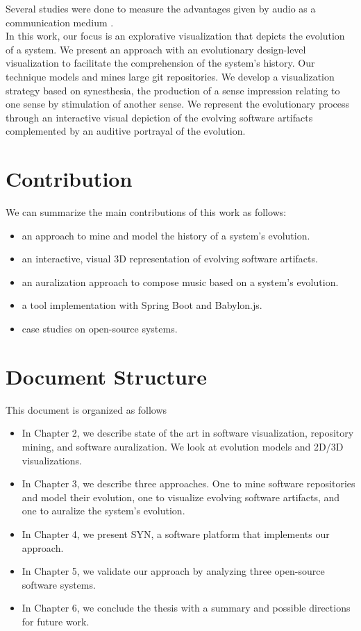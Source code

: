 Several studies were done to measure the advantages given by audio as a communication medium \cite{Alty1995}. \\
In this work, our focus is an explorative visualization that depicts the evolution of a system.
We present an approach with an evolutionary design-level visualization to facilitate the comprehension of the system's history. 
Our technique models and mines large git repositories. We develop a visualization strategy based on synesthesia, the production of a sense impression relating to one sense by stimulation of another sense. We represent the evolutionary process through an interactive visual depiction of the evolving software artifacts complemented by an auditive portrayal of the evolution. 

\section{Contribution}
We can summarize the main contributions of this work as follows:
\begin{itemize}
 \item an approach to mine and model the history of a system's evolution.
 \item an interactive, visual 3D representation of evolving software artifacts.
 \item an auralization approach to compose music based on a system's evolution.
 \item a tool implementation with Spring Boot and Babylon.js.
 \item case studies on open-source systems.
\end{itemize}


\section{Document Structure}
This document is organized as follows
\begin{itemize}
 \item In Chapter 2, we describe state of the art in software visualization, repository mining, and software auralization. We look at evolution models and 2D/3D visualizations. 
 \item In Chapter 3, we describe three approaches. One to mine software repositories and model their evolution, one to visualize evolving software artifacts, and one to auralize the system's evolution. 
 \item In Chapter 4, we present SYN, a software platform that implements our approach. 
 \item In Chapter 5, we validate our approach by analyzing three open-source software systems. 
 \item In Chapter 6, we conclude the thesis with a summary and possible directions for future work.
 \end{itemize}
